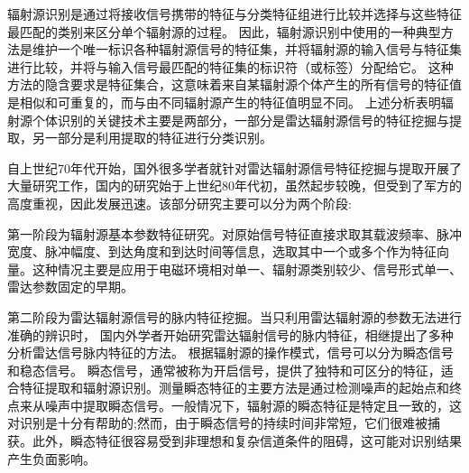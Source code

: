 辐射源识别是通过将接收信号携带的特征与分类特征组进行比较并选择与这些特征最匹配的类别来区分单个辐射源的过程。
因此，辐射源识别中使用的一种典型方法是维护一个唯一标识各种辐射源信号的特征集，并将辐射源的输入信号与特征集进行比较，并将与输入信号最匹配的特征集的标识符（或标签）分配给它。
这种方法的隐含要求是特征集合，这意味着来自某辐射源个体产生的所有信号的特征值是相似和可重复的，而与由不同辐射源产生的特征值明显不同。
上述分析表明辐射源个体识别的关键技术主要是两部分，一部分是雷达辐射源信号的特征挖掘与提取，另一部分是利用提取的特征进行分类识别。

自上世纪70年代开始，国外很多学者就针对雷达辐射源信号特征挖掘与提取开展了大量研究工作，国内的研究始于上世纪80年代初，虽然起步较晚，但受到了军方的高度重视，因此发展迅速。该部分研究主要可以分为两个阶段:

第一阶段为辐射源基本参数特征研究。对原始信号特征直接求取其载波频率、脉冲宽度、脉冲幅度、到达角度和到达时间等信息，选取其中一个或多个作为特征向量。这种情况主要是应用于电磁环境相对单一、辐射源类别较少、信号形式单一、雷达参数固定的早期。

第二阶段为雷达辐射源信号的脉内特征挖掘。当只利用雷达辐射源的参数无法进行准确的辨识时，
国内外学者开始研究雷达辐射信号的脉内特征，相继提出了多种分析雷达信号脉内特征的方法。
根据辐射源的操作模式，信号可以分为瞬态信号和稳态信号。
瞬态信号，通常被称为开启信号，提供了独特和可区分的特征，适合特征提取和辐射源识别。测量瞬态特征的主要方法是通过检测噪声的起始点和终点来从噪声中提取瞬态信号。一般情况下，辐射源的瞬态特征是特定且一致的，这对识别是十分有帮助的;然而，由于瞬态信号的持续时间非常短，它们很难被捕获。此外，瞬态特征很容易受到非理想和复杂信道条件的阻碍，这可能对识别结果产生负面影响。

